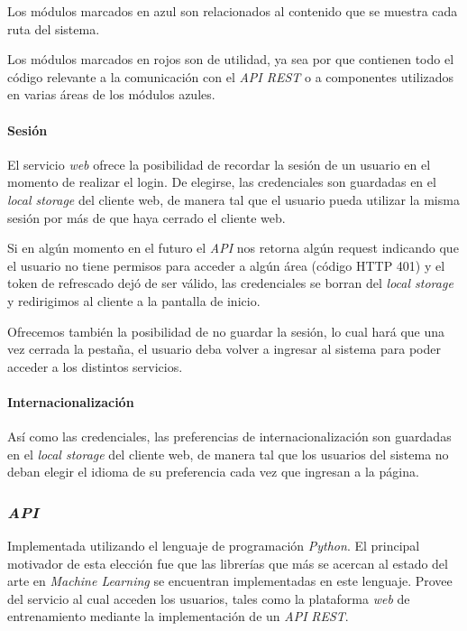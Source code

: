 \documentclass[12pt,a4paper,]{scrartcl}
\let\oldparagraph\paragraph
\renewcommand{\paragraph}[1]{\oldparagraph{#1}\mbox{}}
\begin{document}
Los módulos marcados en azul son relacionados al contenido que se muestra cada ruta del sistema.

Los módulos marcados en rojos son de utilidad, ya sea por que contienen todo el código relevante a la comunicación con el \emph{API REST} o a componentes utilizados en varias áreas de los módulos azules.

\hypertarget{sesiuxf3n}{%
\paragraph{Sesión}\label{sesiuxf3n}}

El servicio \emph{web} ofrece la posibilidad de recordar la sesión de un usuario en el momento de realizar el login. De elegirse, las credenciales son guardadas en el \emph{local storage} del cliente web, de manera tal que el usuario pueda utilizar la misma sesión por más de que haya cerrado el cliente web.

Si en algún momento en el futuro el \emph{API} nos retorna algún request indicando que el usuario no tiene permisos para acceder a algún área (código HTTP 401) y el token de refrescado dejó de ser válido, las credenciales se borran del \emph{local storage} y redirigimos al cliente a la pantalla de inicio.

Ofrecemos también la posibilidad de no guardar la sesión, lo cual hará que una vez cerrada la pestaña, el usuario deba volver a ingresar al sistema para poder acceder a los distintos servicios.

\hypertarget{internacionalizaciuxf3n}{%
\paragraph{Internacionalización}\label{internacionalizaciuxf3n}}

Así como las credenciales, las preferencias de internacionalización son guardadas en el \emph{local storage} del cliente web, de manera tal que los usuarios del sistema no deban elegir el idioma de su preferencia cada vez que ingresan a la página.

\hypertarget{api-2}{%
\subsubsection{\texorpdfstring{\emph{API}}{API}}\label{api-2}}

Implementada utilizando el lenguaje de programación \emph{Python}. El principal motivador de esta elección fue que las librerías que más se acercan al estado del arte en \emph{Machine Learning} se encuentran implementadas en este lenguaje. Provee del servicio al cual acceden los usuarios, tales como la plataforma \emph{web} de entrenamiento mediante la implementación de un \emph{API} \emph{REST}.
\end{document}
